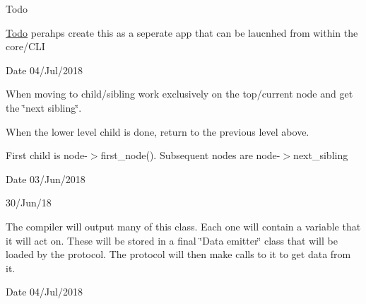 \begin{DoxyRefDesc}{Todo}
\item[\mbox{\hyperlink{todo__todo000033}{Todo}}]perahps create this as a seperate app that can be laucnhed from within the core/\+C\+LI \end{DoxyRefDesc}


\begin{DoxyDate}{Date}
04/\+Jul/2018
\end{DoxyDate}
When moving to child/sibling work exclusively on the top/current node and get the \char`\"{}next sibling\char`\"{}.

When the lower level child is done, return to the previous level above.

First child is node-\/$>$first\+\_\+node(). Subsequent nodes are node-\/$>$next\+\_\+sibling

\begin{DoxyDate}{Date}
03/\+Jun/2018

30/\+Jun/18
\end{DoxyDate}
The compiler will output many of this class. Each one will contain a variable that it will act on. These will be stored in a final \char`\"{}\+Data emitter\char`\"{} class that will be loaded by the protocol. The protocol will then make calls to it to get data from it.

\begin{DoxyDate}{Date}
04/\+Jul/2018 
\end{DoxyDate}
